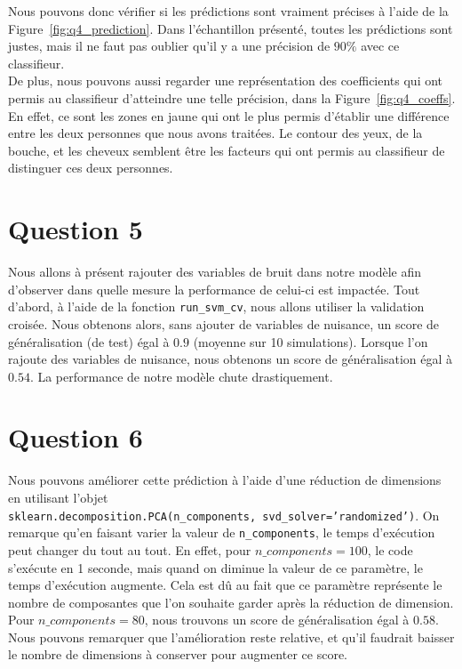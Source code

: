\documentclass{article}
\begin{document}
Nous pouvons donc vérifier si les prédictions sont vraiment précises à l'aide de la Figure~\ref{fig:q4_prediction}. Dans l'échantillon présenté, toutes les prédictions sont justes, mais il ne faut pas oublier qu'il y a une précision de $90\%$ avec ce classifieur.\\
De plus, nous pouvons aussi regarder une représentation des coefficients qui ont permis au classifieur d'atteindre une telle précision, dans la Figure~\ref{fig:q4_coeffs}. En effet, ce sont les zones en jaune qui ont le plus permis d'établir une différence entre les deux personnes que nous avons traitées. Le contour des yeux, de la bouche, et les cheveux semblent être les facteurs qui ont permis au classifieur de distinguer ces deux personnes.

\section{Question 5}

Nous allons à présent rajouter des variables de bruit dans notre modèle afin d'observer dans quelle mesure la performance de celui-ci est impactée. Tout d'abord, à l'aide de la fonction \texttt{run\_svm\_cv}, nous allons utiliser la validation croisée. Nous obtenons alors, sans ajouter de variables de nuisance, un score de généralisation (de test) égal à $0.9$ (moyenne sur 10 simulations). Lorsque l'on rajoute des variables de nuisance, nous obtenons un score de généralisation égal à $0.54$. La performance de notre modèle chute drastiquement.

\section{Question 6}

Nous pouvons améliorer cette prédiction à l'aide d'une réduction de dimensions en utilisant l'objet \\ \texttt{sklearn.decomposition.PCA(n\_components, svd\_solver='randomized')}. On remarque qu'en faisant varier la valeur de \texttt{n\_components}, le temps d'exécution peut changer du tout au tout. En effet, pour $n\_components = 100$, le code s'exécute en 1 seconde, mais quand on diminue la valeur de ce paramètre, le temps d'exécution augmente. Cela est dû au fait que ce paramètre représente le nombre de composantes que l'on souhaite garder après la réduction de dimension.\\
Pour $n\_components = 80$, nous trouvons un score de généralisation égal à $0.58$. Nous pouvons remarquer que l'amélioration reste relative, et qu'il faudrait baisser le nombre de dimensions à conserver pour augmenter ce score.
\end{document}
